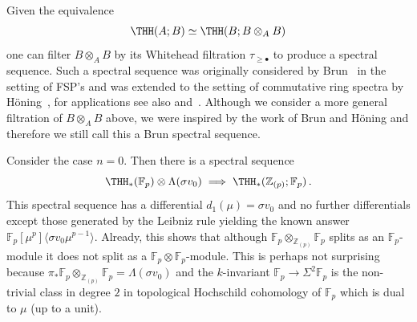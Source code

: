 \begin{remark}
Given the equivalence  
\[ \THH(A;B)\simeq \THH(B;B\otimes_{A}B)\]
one can filter $B\otimes_{A}B$ by its Whitehead filtration $\tau_{\ge \bullet}$ to produce a spectral sequence. Such a spectral sequence was originally considered by Brun~\cite{Bru00} in the setting of FSP's and was extended to the setting of commutative ring spectra by H\"oning~\cite{Hon20}, for applications see also \cite{Cha25} and~\cite{Hys23}. Although we consider a more general filtration of $B\otimes_{A}B$ above, we were inspired by the work of Brun and H\"oning and therefore we still call this a Brun spectral sequence. 
\end{remark}
\begin{example}
Consider the case $n=0$. Then there is a spectral sequence 
\[ 
\THH_{*}(\mathbb{F}_{p})\otimes \Lambda (\sigma v_{0})\implies \THH_{*}(\mathbb{Z}_{(p)};\mathbb{F}_{p}) \,.
\]
This spectral sequence has a differential $d_{1}(\mu)=\sigma v_{0}$ and no further differentials except those generated by the Leibniz rule yielding the known answer $\mathbb{F}_p[\mu^p]\langle \sigma v_0 \mu^{p-1}\rangle$. 
Already, this shows that although $\mathbb{F}_p\otimes_{\mathbb{Z}_{(p)}}\mathbb{F}_p$ splits as an $\mathbb{F}_p$-module it does not split as a $\mathbb{F}_p\otimes \mathbb{F}_p$-module. This is perhaps not surprising because $\pi_*\mathbb{F}_p\otimes_{\mathbb{Z}_{(p)}}\mathbb{F}_p=\Lambda (\sigma v_0)$ and the $k$-invariant $\mathbb{F}_p\to \Sigma^{2}\mathbb{F}_p$ is the non-trivial class in degree $2$ in topological Hochschild cohomology of $\mathbb{F}_p$ which is dual to $\mu$ (up to a unit).
\end{example}

